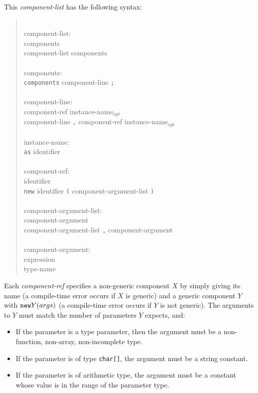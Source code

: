 \documentclass[11pt,letterpaper]{article}
\newcommand{\kw}[1]{{\tt #1}}
\newcommand{\code}[1]{{\tt #1}}
\newcommand{\opt}{$_{\mbox{opt}}$\xspace}
\newcommand{\grammarshift}{\vspace*{-.7cm}}
\newcommand{\grammarindent}{\hspace*{2cm}\= \\ \kill}
\begin{document}
This \emph{component-list} has the following syntax:
\begin{quote} \grammarshift \em \begin{tabbing}
\grammarindent
component-list:\\
\>	components\\
\>	component-list components\\
\\
components:\\
\>	\kw{components} component-line \kw{;}\\
\\
component-line:\\
\>	component-ref instance-name\opt\\
\>	component-line \kw{,} component-ref instance-name\opt\\
\\
instance-name:\\
\>	\kw{as} identifier\\
\\
component-ref:\\
\>	identifier\\
\>	\kw{new} identifier \kw{(} component-argument-list \kw{)}\\
\\
component-argument-list:\\
\>	component-argument\\
\>	component-argument-list \kw{,} component-argument\\
\\
component-argument:\\
\>	expression\\
\>	type-name
\end{tabbing} \end{quote}
Each \emph{component-ref} specifies a non-generic component $X$ by simply
giving its name (a compile-time error occurs if $X$ is generic) and
a generic component $Y$ with $\kw{new} Y(args)$ (a compile-time error occurs
if $Y$ is not generic). The arguments to $Y$ must match the number of
parameters $Y$ expects, and:
\begin{itemize}
\item If the parameter is a type parameter, then the argument must be
a non-function, non-array, non-incomplete type.
\item If the parameter is of type \code{char[]}, the argument must be
a string constant.
\item If the parameter is of arithmetic type, the argument must be a 
constant whose value is in the range of the parameter type.
\end{itemize}
\end{document}
